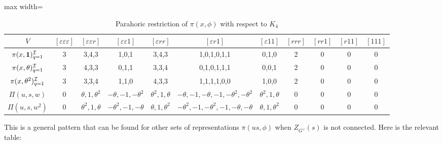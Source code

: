 \begin{table}[h]
    \centering
    \caption{Parahoric restriction of $\pi(x,\phi)$ with respect to $K_4$}
    \label{tab:worked_example_3}
    \begin{adjustbox}{max width=\linewidth}
    \begin{tabular}{|c|cccccccccc|}
    \hline
    $V$ & $[\varepsilon\varepsilon\varepsilon]$ & $[\varepsilon\varepsilon r]$ & $[\varepsilon\varepsilon 1]$ & $[\varepsilon r r]$ & $[\varepsilon r 1]$ & $[\varepsilon 1 1]$ & $[r r r]$ & $[r r 1]$ & $[r 1 1]$ & $[1 1 1]$ \\ \hline

    $\pi(x,\mathbf{1})^{\mathcal{I}}_{q=1}$ & 3 & 3,4,3 & 1,0,1 & 3,4,3 & 1,0,1,0,1,1 & 0,1,0 & 2 & 0 & 0 & 0 \\ 
    $\pi(x,\theta)^{\mathcal{I}}_{q=1}$ & 3 & 4,3,3 & 0,1,1 & 3,3,4 & 0,1,0,1,1,1 & 0,0,1 & 2 & 0 & 0 & 0 \\
    $\pi(x,\theta^2)^{\mathcal{I}}_{q=1}$ & 3 & 3,3,4 & 1,1,0 & 4,3,3 & 1,1,1,1,0,0 & 1,0,0 & 2 & 0 & 0 & 0 \\ \hline
    $\Pi(u,s,w)$      & 0 & $\theta,1,\theta^2$ & $-\theta,-1,-\theta^2$ & $\theta^2,1,\theta$ & $-\theta,-1,-\theta,-1,-\theta^2,-\theta^2$ & $\theta^2,1,\theta$ & 0 & 0 & 0 & 0 \\
    $\Pi(u,s,w^2)$ & 0 & $\theta^2,1,\theta$ & $-\theta^2,-1,-\theta$ & $\theta,1,\theta^2$ & $-\theta^2,-1,-\theta^2,-1,-\theta,-\theta$ & $\theta,1,\theta^2$ & 0 & 0 & 0 & 0 \\ \hline

    \end{tabular}
    \end{adjustbox}
\end{table}

This is a general pattern that can be found for other sets of representations $\pi(us,\phi)$ when $Z_{G^\vee}(s)$ is not connected. Here is the relevant table:


